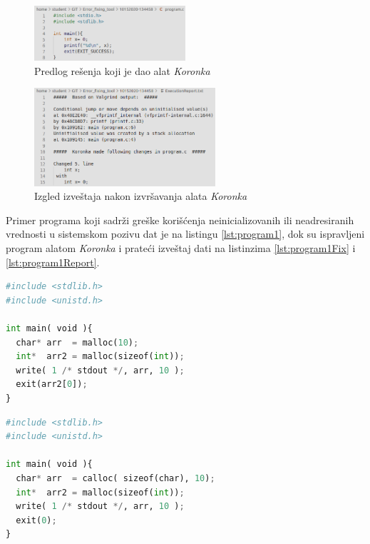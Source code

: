 \documentclass[12pt,oneside]{memoir}
\theoremstyle{plain}
\theoremstyle{definition}
\begin{document}
\begin{figure}[!ht]
  \centering
  \includegraphics[width=0.5\textwidth]{FixedProgram.png}
  \caption{Predlog rešenja koji je dao alat \textit{Koronka}}
  \label{fig:slika4.13}
\end{figure}

\begin{figure}[!ht]
  \centering
  \includegraphics[width=0.6\textwidth]{ExecutionReport.png}
  \caption{Izgled izveštaja nakon izvršavanja alata \textit{Koronka}}
  \label{fig:slika4.14}
\end{figure}

\newpage
Primer programa koji sadrži greške korišćenja neinicializovanih ili neadresiranih vrednosti u sistemskom pozivu dat je na listingu \ref{lst:program1}, dok su ispravljeni program alatom \textit{Koronka} i prateći izveštaj dati na listinzima \ref{lst:program1Fix} i \ref{lst:program1Report}.

\begin{lstlisting}[style=mystyle,caption={Program koji sadrži greške korišćenja neinicializovanih ili neadresiranih vrednosti u sistemskom pozivu}, label={lst:program1},language={Python}] 
#include <stdlib.h>
#include <unistd.h>

int main( void ){
  char* arr  = malloc(10);
  int*  arr2 = malloc(sizeof(int));
  write( 1 /* stdout */, arr, 10 );
  exit(arr2[0]);
}
\end{lstlisting}

\begin{lstlisting}[style=mystyle,caption={Predlog rešenja alata \textit{Koronka} za greške otkrivene u programu sa listinga \ref{lst:program1}}, label={lst:program1Fix},language={Python}] 
#include <stdlib.h>
#include <unistd.h>

int main( void ){
  char* arr  = calloc( sizeof(char), 10);
  int*  arr2 = malloc(sizeof(int));
  write( 1 /* stdout */, arr, 10 );
  exit(0);
}
\end{lstlisting}
\end{document}

